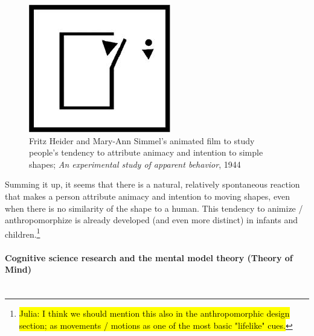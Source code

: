 \documentclass{frontiersSCNS} %
\begin{document}
\begin{figure}[h]\centering
  \includegraphics[scale=0.6]{heider-simmel_animation.jpeg}
 \caption{Fritz Heider and Mary-Ann Simmel's animated film to study people's tendency to attribute animacy and intention to simple shapes; \textit{An experimental study of apparent behavior}, 1944}
 \label{fig:animacy_attribution}       %
 \end{figure}

Summing it up, it seems that there is a natural, relatively spontaneous reaction that makes a person attribute animacy and intention to moving shapes, even when there is no similarity of the shape to a human. This tendency to animize / anthropomorphize is already developed (and even more distinct) in infants and children.\footnote{\hl{Julia: I think we should mention this also in the anthropomorphic design section; as movements / motions as one of the most basic "lifelike" cues.}}


\paragraph*{Cognitive science research and the mental model theory (Theory of Mind)\\ \\}
\end{document}
